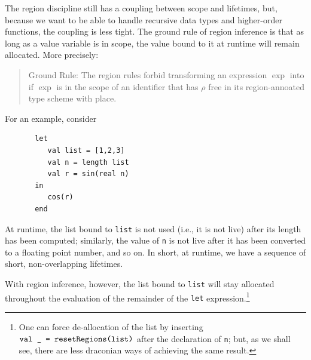 \documentclass[12pt]{book}
\begin{document}
The region discipline still has a coupling between scope and lifetimes,
but, because we want to be able to handle recursive data types and higher-order
functions, the coupling is less tight. 
The ground rule of region inference
%
%
is that as long as a value variable is in scope, the value bound to it
at runtime will remain allocated. More precisely:
\begin{quote}
  Ground Rule: The region rules forbid transforming an expression
  $\exp$ into  if $\exp$ is in
  the scope of an identifier that has $\rho$ free in its
  region-annoated type scheme with place.
\end{quote}
For an example, consider
\begin{verbatim}
       let 
          val list = [1,2,3]
          val n = length list
          val r = sin(real n)
       in
          cos(r)
       end
\end{verbatim} 
At runtime, the list bound to {\tt list} is not used (i.e., it is not live) 
after its length has been computed;
similarly, the value of {\tt n} is not live after it has been converted to a floating point
number, and so on. In short, at runtime, we have a sequence of short, non-overlapping
lifetimes. 

With region inference, however, the list bound to {\tt list} will stay allocated
throughout the evaluation of the remainder of the {\tt let} expression.\footnote{One can
force de-allocation of the list by  inserting 
$\hbox{\tt val \_ = \hbox{\tt resetRegions}(list)}$ after the declaration of {\tt n}; but, as we shall see,
there are less draconian ways of achieving the same result.} 
\end{document}
